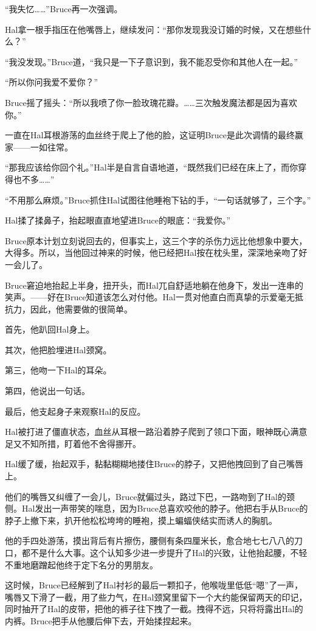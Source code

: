 \documentclass[../main.tex]{subfiles}
\begin{document}
“我失忆\ldots\ldots”Bruce再一次强调。

Hal拿一根手指压在他嘴唇上，继续发问：“那你发现我没订婚的时候，又在想些什么？”

“我没发现。”Bruce道，“我只是一下子意识到，我不能忍受你和其他人在一起。”

“所以你问我爱不爱你？”

Bruce摇了摇头：“所以我喷了你一脸玫瑰花瓣。\ldots\ldots 三次触发魔法都是因为喜欢你。”

一直在Hal耳根游荡的血丝终于爬上了他的脸，这证明Bruce是此次调情的最终赢家——一如往常。

“那我应该给你回个礼。”Hal半是自言自语地道，“既然我们已经在床上了，而你穿得也不多\ldots\ldots”

“不用那么麻烦。”Bruce抓住Hal试图往他睡袍下钻的手，“一句话就够了，三个字。”

Hal揉了揉鼻子，抬起眼直直地望进Bruce的眼底：“我爱你。”

Bruce原本计划立刻说回去的，但事实上，这三个字的杀伤力远比他想象中要大，大得多。所以，当他回过神来的时候，他已经把Hal按在枕头里，深深地亲吻了好一会儿了。

Bruce窘迫地抬起上半身，扭开头，而Hal兀自舒适地躺在他身下，发出一连串的笑声。——好在Bruce知道该怎么对付他。Hal一贯对他直白而真挚的示爱毫无抵抗力，因此，他需要做的很简单。

首先，他趴回Hal身上。

其次，他把脸埋进Hal颈窝。

第三，他吻一下Hal的耳朵。

第四，他说出一句话。

最后，他支起身子来观察Hal的反应。

Hal被打进了僵直状态，血丝从耳根一路沿着脖子爬到了领口下面，眼神既心满意足又不知所措，盯着他不舍得挪开。

Hal缓了缓，抬起双手，黏黏糊糊地搂住Bruce的脖子，又把他拽回到了自己嘴唇上。

他们的嘴唇又纠缠了一会儿，Bruce就偏过头，路过下巴，一路吻到了Hal的颈侧。Hal发出一声带笑的喘息，因为Bruce总喜欢咬他的脖子。他把右手从Bruce的脖子上撤下来，扒开他松松垮垮的睡袍，摸上蝙蝠侠结实而诱人的胸肌。

他的手四处游荡，摸出背后有片擦伤，腰侧有条四厘米长，愈合地七七八八的刀口，都不是什么大事。这个认知多少进一步提升了Hal的兴致，让他抬起腰，不轻不重地磨蹭起他终于定下名分的男朋友。

这时候，Bruce已经解到了Hal衬衫的最后一颗扣子，他喉咙里低低“嗯”了一声，嘴唇又下滑了一截，用了些力气，在Hal颈窝里留下一个大约能保留两天的印记，同时抽开了Hal的皮带，把他的裤子往下拽了一截。拽得不远，只将将露出Hal的内裤。Bruce把手从他腰后伸下去，开始揉捏起来。
\end{document}
